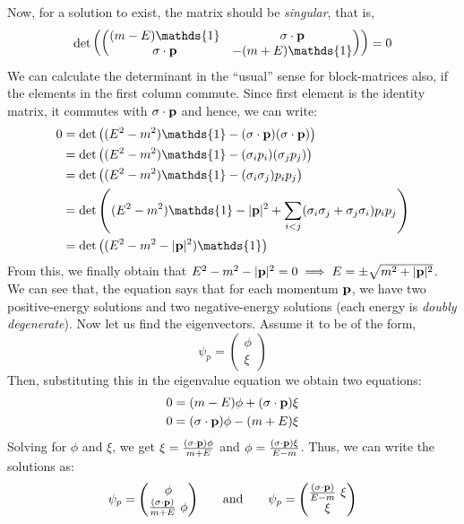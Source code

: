 Now, for a solution to exist, the matrix should be \textit{singular}, that is,
$$\det\qty(\begin{pmatrix}
        (m-E)\mathds{1} & \sigma\cdot \vb{p} \\
        \sigma\cdot \vb{p} & -(m+E)\mathds{1}
    \end{pmatrix}) = 0$$
    We can calculate the determinant in the ``usual'' sense for block-matrices also, if the elements in the first column commute. Since first element is the identity matrix, it commutes with $\sigma\cdot \vb{p}$ and hence, we can write:
    \begin{align}\label{eqn:diracalpha}
        \begin{split}
        0&= \det\qty((E^2 - m^2)\mathds{1} - (\sigma\cdot\vb{p})(\sigma\cdot\vb{p})) \\
&=\det\qty((E^2 - m^2)\mathds{1} - (\sigma_i p_i)(\sigma_jp_j))\\
&=\det\qty((E^2 - m^2)\mathds{1} - (\sigma_i \sigma_j)p_ip_j)\\
&=\det\qty((E^2 - m^2)\mathds{1} - |\vb{p}|^2 +\sum\limits_{i<j} (\sigma_i\sigma_j + \sigma_j \sigma_i)p_i p_j)\\
&=\det\qty((E^2 - m^2 - |\vb{p}|^2)\mathds{1})
        \end{split}
    \end{align}
From this, we finally obtain that $E^2 - m^2 - |\vb{p}|^2 = 0\implies E = \pm \sqrt{m^2 +|\vb{p}|^2}$. We can see that, the equation says that for each momentum $\vb{p}$, we have two positive-energy solutions and two negative-energy solutions (each energy is \textit{doubly degenerate}). Now let us find the eigenvectors. Assume it to be of the form, 
$$\psi_p =\begin{pmatrix}
    \phi\\
    \xi
\end{pmatrix} $$
Then, substituting this in the eigenvalue equation we obtain two equations:
\begin{align*}
    0 &= (m-E)\phi + (\sigma\cdot \vb{p})\xi \\
    0 &= (\sigma\cdot \vb{p})\phi -(m+E)\xi
\end{align*}
Solving for $\phi$ and $\xi$, we get $\xi = \frac{(\sigma\cdot \vb{p})\phi}{m+E}$ and $\phi = \frac{(\sigma\cdot \vb{p})\xi}{E-m}$. Thus, we can write the solutions as:
\begin{equation}\label{eqn:fourier}
    \psi_p = \mqty(\phi \\ \frac{(\sigma\cdot \vb{p})}{m+E}\ \phi)\qquad \text{and}\qquad \psi_p = \mqty(\frac{(\sigma\cdot \vb{p})}{E-m}\ \xi \\ \xi)
\end{equation}
